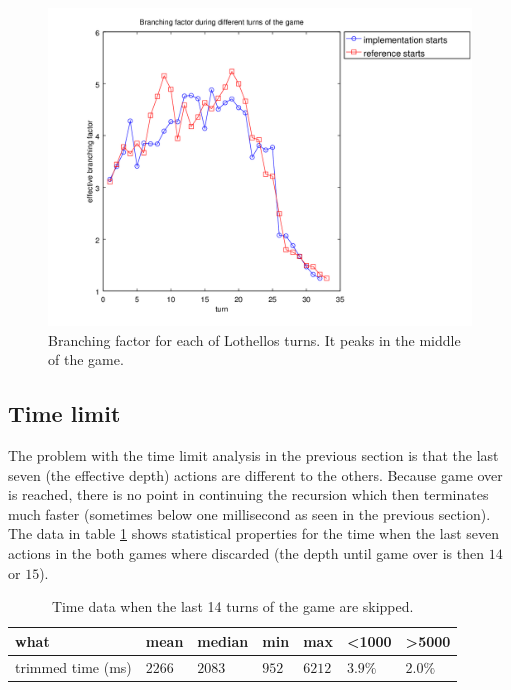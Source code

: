 \documentclass[a4paper,11pt]{article}
\begin{document}
\begin{figure}

\centering
\includegraphics[scale=0.78]{branchingLegend.png}

\caption{Branching factor for each of Lothellos turns. It peaks in the middle of the game.} \label{fig:branching}

\end{figure}

\subsection{Time limit}
The problem with the time limit analysis in the previous section is that the last seven (the effective depth) actions are different to the others. Because game over is reached, there is no point in continuing the recursion which then terminates much faster (sometimes below one millisecond as seen in the previous section). The data in table \ref{tab:trimmed} shows statistical properties for the time when the last seven actions in the both games where discarded (the depth until game over is then $14$ or $15$).

\begin{table}

\centering
\begin{tabular}{|l|l|l|l|l|l|l|}
\hline
\textbf{what} & \textbf{mean} & \textbf{median} & \textbf{min} & \textbf{max} & \textbf{<1000} & \textbf{>5000}
\\ \hline
trimmed time (ms) & $2266$ & $2083$ & $952$ & $6212$ & $3.9\%$ & $2.0\%$
\\ \hline
\end{tabular}

\caption{Time data when the last 14 turns of the game are skipped.} \label{tab:trimmed}

\end{table}
\end{document}
